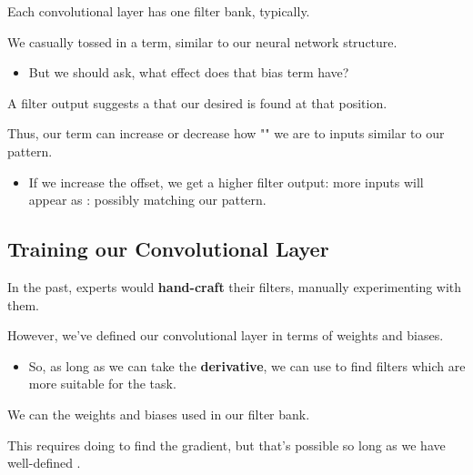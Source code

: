         Each convolutional layer has one filter bank, typically.
        
        We casually tossed in a  term, similar to our neural network structure.

        \begin{itemize}
            \item But we should ask, what effect does that bias term have?\\
        \end{itemize}

        \begin{concept}
            A  filter output suggests a  that our desired  is found at that position.

            Thus, our  term can increase or decrease how "" we are to inputs similar to our pattern.

            \begin{itemize}
                \item If we increase the offset, we get a higher filter output: more inputs will appear as : possibly matching our pattern.
            \end{itemize}
        \end{concept}

    \subsection{Training our Convolutional Layer}

        In the past, experts would \textbf{hand-craft} their filters, manually experimenting with them.

        However, we've defined our convolutional layer in terms of  weights and biases.

        \begin{itemize}
            \item So, as long as we can take the \textbf{derivative}, we can use  to find filters which are more suitable for the task.\\
        \end{itemize}

        \begin{concept}
            We can  the weights and biases used in our filter bank.

            This requires doing  to find the gradient, but that's possible so long as we have well-defined .
        \end{concept}

